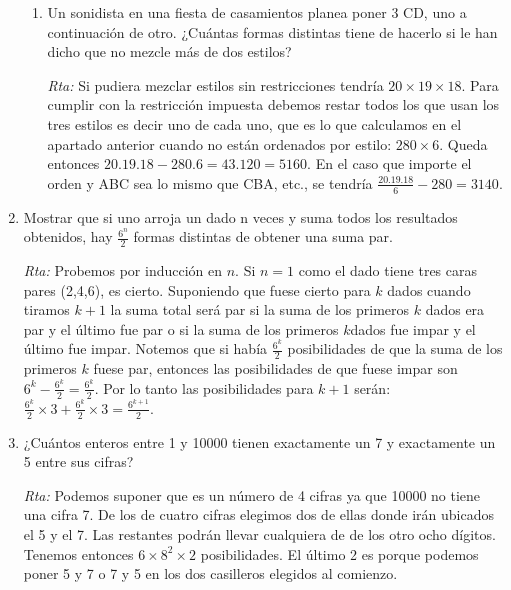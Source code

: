 \begin{enumerate}
\begin{enumerate}
    \item Un sonidista en una fiesta de casamientos planea poner 3 CD, uno a continuación
    de otro. ¿Cuántas formas distintas tiene de hacerlo si le han dicho que no
    mezcle más de dos estilos?
    
    \noindent\textit{Rta:} Si pudiera mezclar estilos  sin restricciones tendría  $20\times 19\times 18$. Para cumplir con la restricción impuesta debemos restar todos los que usan los tres estilos es decir uno de cada uno, que es lo que calculamos en el  apartado anterior cuando no están ordenados por estilo: $280\times 6$. Queda entonces $20.19.18-280.6=43.120=5160$. En el caso que importe el orden y ABC sea lo mismo que CBA, etc., se tendría $\frac{20.19.18}{6}-280=3140$.
    \end{enumerate}
    
    
    
    \item Mostrar que si uno arroja un dado n veces y suma todos los resultados obtenidos,
    hay $\frac{6^n}{2}$
    formas distintas de obtener una suma par.
    
    \noindent\textit{Rta:} Probemos por inducción en $n$. Si $n=1$ como el dado tiene tres caras pares (2,4,6), es cierto.
    Suponiendo que fuese cierto para $k$ dados cuando tiramos $k+1$ la suma total será par si la suma de los primeros $k$ dados era par y el último fue par o si la suma de los primeros $k$dados fue impar y el último fue impar. Notemos que si había $\frac{6^k}{2}$ posibilidades de que la suma de los primeros $k$ fuese par, entonces las posibilidades de que fuese impar son $6^k-\frac{6^k}{2}=\frac{6^k}{2}$. Por lo tanto las posibilidades para $k+1$ serán:${ \frac{6^k}{2}\times 3+\frac{6^k}{2}\times 3=\frac{6^{k+1}}{2}}$.
    
    
    
    \item ¿Cuántos enteros entre 1 y 10000 tienen exactamente un 7 y exactamente un 5
    entre sus cifras?
    
    \noindent\textit{Rta:} Podemos suponer que es un número de 4 cifras ya que 10000 no tiene una cifra 7.
    De los de cuatro cifras elegimos dos de ellas donde irán ubicados el 5 y el 7. Las restantes podrán llevar cualquiera de de los otro ocho dígitos. Tenemos entonces $6\times 8^2\times 2$ posibilidades. El último 2 es porque podemos poner 5 y 7 o 7 y 5 en los dos casilleros elegidos al comienzo.
    
    
    

\end{enumerate}
